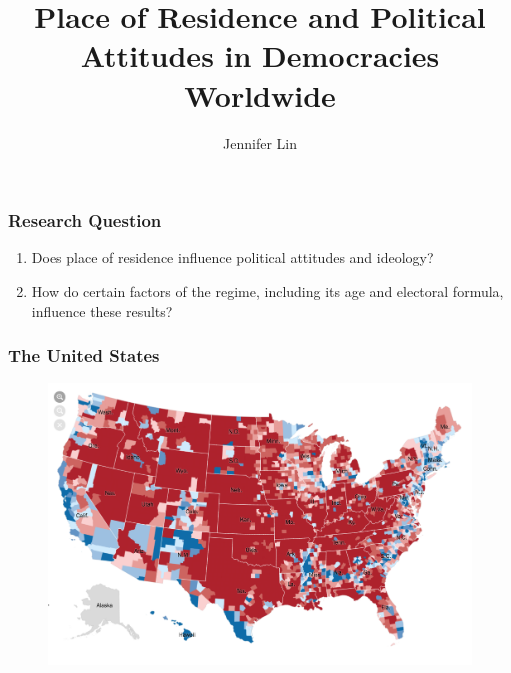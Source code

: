 \documentclass[20pt]{beamer}
\begin{document}
	\author{Jennifer Lin}
	\title{Place of Residence and Political Attitudes in Democracies Worldwide}
	\begin{frame}[plain]
	\maketitle
\end{frame}

\begin{frame}
\frametitle{Research Question}
\begin{enumerate}
	\item Does place of residence influence political attitudes and ideology? 
	\item How do certain factors of the regime, including its age and electoral formula, influence these results?
\end{enumerate}
\end{frame}

\begin{frame}
\frametitle{The United States}
\begin{figure}[H]    \centering
	{	 \includegraphics[width=\textwidth]{NYT}}
\end{figure}
\end{frame}
\end{document}
